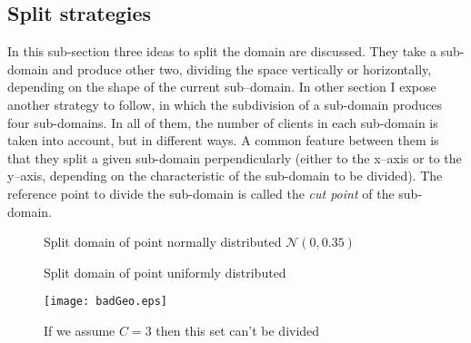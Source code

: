 
\subsection{Split strategies}

In this sub-section three ideas to split the domain are discussed. They take a sub-domain and produce other two, dividing the space vertically or horizontally, depending on the shape of the current sub--domain. In other section I expose another strategy to follow, in which the subdivision of a sub-domain produces four sub-domains. In all of them, the number of clients in each sub-domain is taken into account, but in different ways. A common feature between them is that they split a given sub-domain perpendicularly (either to the x--axis or to the y--axis, depending on the characteristic of the sub-domain to be divided). The reference point to divide the sub-domain is called the {\it cut point} of the sub-domain.

\begin{figure}
	\centering
	\hspace{3pt}%
	\hspace{3pt}%
	\caption[]{Split domain of point normally distributed $\mathcal{N}\left(0,0.35\right)$}%
	\label{split:norm}
\end{figure}

\begin{figure}
	\centering
	\hspace{3pt}%
	\hspace{3pt}%
	\caption[]{Split domain of point uniformly distributed}%
	\label{split:unif}
\end{figure}

\begin{figure}
	\centering
	\texttt{[image: badGeo.eps]}
	\caption[]{If we assume $C = 3$ then this set can't be divided}%
	\label{fig:badGeom}
\end{figure}

